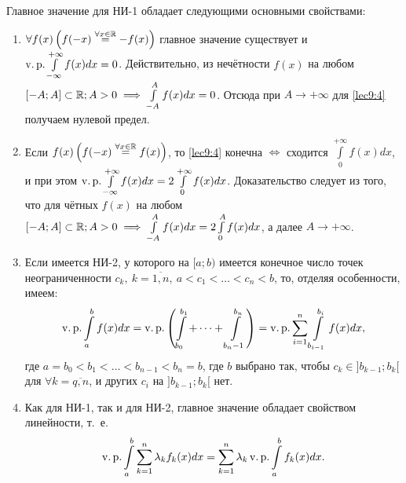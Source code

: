 \documentclass[../../main.tex]{subfiles}
\begin{document}
Главное значение для НИ-1 обладает следующими основными свойствами:
\begin{enumerate}[label=\arabic*$^{\circ}$.]
\item
$ \forall f(x) \left(f(-x) \stackrel{\forall x \in \mathbb{R}}{=} -f(x) \right) $
главное значение существует и $\operatorname{v.p.}\int\limits_{-\infty}^{+\infty}f(x)dx=0$.
Действительно, из нечётности $ f(x) $ на любом $ [-A; A] \subset \mathbb{R}; A > 0 
\implies \int\limits_{-A}^A f(x) dx = 0$. Отсюда при $ A \to +\infty $ для
\eqref{lec9:4} получаем нулевой предел.
\item
Если $ f(x) \left(f(-x) \stackrel{\forall x \in \mathbb{R}}{=} f(x) \right) $, то
\eqref{lec9:4} конечна $ \iff $ сходится $ \int\limits_0^{+\infty}f(x)dx $, и 
при этом $ \operatorname{v.p.} \int\limits_{-\infty}^{+\infty} f(x) dx = 
2\int\limits_0^{+\infty} f(x) dx$. Доказательство следует из того, что для
чётных $ f(x) $ на любом $ [-A; A] \subset \mathbb{R}; A > 0 
\implies \int\limits_{-A}^A f(x) dx = 2\int\limits_0^A f(x) dx$, а далее 
$ A \to +\infty $.
\item
Если имеется НИ-2, у которого на $ [a; b) $ имеется конечное число точек
неограниченности $ c_k,\ k = \overline{1,n},\ a < c_1 < \dots <
c_n < b $, то, отделяя особенности, имеем: \[\operatorname{v.p.} \int\limits_a^b f(x) dx = 
\operatorname{v.p.} \left(\int\limits_{b_0}^{b_1} + \dots + \int\limits_{b_n - 1}^{b_n}
\right) = \operatorname{v.p.} \sum\limits_{i = 1}^n \int\limits_{b_{i - 1}}^{b_i} f(x)dx, \]
где $ a = b_0 < b_1 < \dots < b_{n - 1} < b_n = b $, где $ b $ выбрано так, 
чтобы $ c_k \in ]b_{k - 1}; b_k[ $ для $\forall k = \overline{q, n}$, и других
$ c_i $ 
на $ ]b_{k - 1}; b_k[ $ нет.
\item
Как для НИ-1, так и для НИ-2, главное значение обладает свойством линейности,
т.~е. \[\operatorname{v.p.} \int\limits_a^b \sum\limits_{k = 1}^n \lambda_kf_k(x)dx =
\sum\limits_{k = 1}^n \lambda_k \operatorname{v.p.} \int\limits_a^b f_k(x)dx.\]
\end{enumerate}
\end{document}
